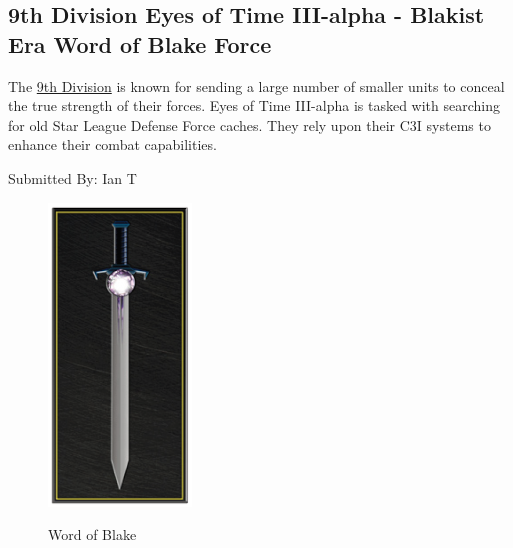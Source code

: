 \subsection{9th Division Eyes of Time III-alpha - Blakist Era Word of Blake Force}

The \href{https://www.sarna.net/wiki/9th_Division_(Word_of_Blake)}{9th Division} is known for sending a large number of smaller units to conceal the true strength of their forces.
Eyes of Time III-alpha is tasked with searching for old Star League Defense Force caches.
They rely upon their C3I systems to enhance their combat capabilities.

Submitted By: Ian T

\begin{figure}[!h]
  \centering
  \includegraphics[alt='Word of Blake Logo', width=1.5in, height=3.167in]{img/Word-of-Blake.png}
  \caption*{Word of Blake}
\end{figure}

